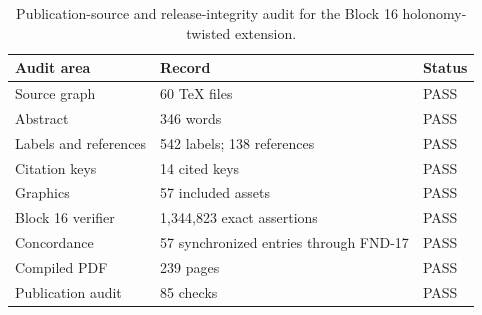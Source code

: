 \begin{table}[htbp]
\centering
\small
\caption{Publication-source and release-integrity audit for the Block 16 holonomy-twisted extension.}
\label{tab:block16-publication-audit}
\begin{tabularx}{\textwidth}{@{}L{0.27\textwidth}YL{0.12\textwidth}@{}}
\toprule
Audit area & Record & Status \\
\midrule
Source graph & 60 TeX files & PASS \\
Abstract & 346 words & PASS \\
Labels and references & 542 labels; 138 references & PASS \\
Citation keys & 14 cited keys & PASS \\
Graphics & 57 included assets & PASS \\
Block 16 verifier & 1,344,823 exact assertions & PASS \\
Concordance & 57 synchronized entries through FND-17 & PASS \\
Compiled PDF & 239 pages & PASS \\
Publication audit & 85 checks & PASS \\
\bottomrule
\end{tabularx}
\end{table}
